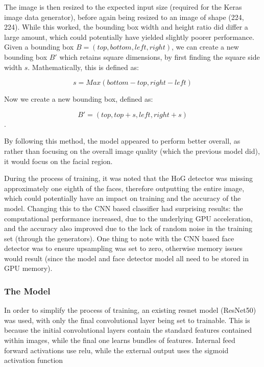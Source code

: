 \documentclass[10pt,a4paper]{article}
\begin{document}
            The image is then resized to the expected input size (required for the Keras image data generator), before again being resized to an image of shape (224, 224).
            While this worked, the bounding box width and height ratio did differ a large amount, which could potentially have yielded slightly poorer performance.
            Given a bounding box $B = (top, bottom, left, right)$, we can create a new bounding box $B'$ which retains square dimensions, by first finding the square
            side width $s$. Mathematically, this is defined as:

            $$s = Max(bottom - top, right - left)$$

            Now we create a new bounding box, defined as:

            $$B' = (top, top + s, left, right + s)$$.

            By following this method, the model appeared to perform better overall, as rather than focusing on the overall image quality (which the previous model did),
            it would focus on the facial region.

            During the process of training, it was noted that the HoG detector was missing approximately one eighth of the faces, therefore outputting the entire image, which
            could potentially have an impact on training and the accuracy of the model. Changing this to the CNN based classifier had surprising results: the computational performance increased,
            due to the underlying GPU acceleration, and the accuracy also improved due to the lack of random noise in the training set (through the generators). One thing to note with the CNN based
            face detector was to ensure upsampling was set to zero, otherwise memory issues would result (since the model and face detector model all need to be stored in GPU memory).
            
        \subsubsection{The Model}

            In order to simplify the process of training, an existing resnet model (ResNet50) was used, with only the final convolutional layer being
            set to trainable. This is because the initial convolutional layers contain the standard features contained within images, while the final one
            learns bundles of features. Internal feed forward activations use relu, while the external output uses the sigmoid activation function
\end{document}
